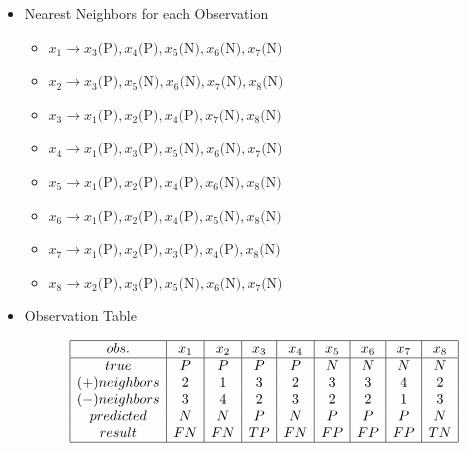 \documentclass[12pt]{article}
\begin{document}
\begin{enumerate}[leftmargin=\labelsep, label=\textbf{\arabic*.)}]
\begin{itemize}
              \item Nearest Neighbors for each Observation

                    \begin{itemize}
                        \item \( x_1 \rightarrow x_3\text{(P)}, x_4\text{(P)}, x_5\text{(N)}, x_6\text{(N)}, x_7\text{(N)} \)
                        \item \( x_2 \rightarrow x_3\text{(P)}, x_5\text{(N)}, x_6\text{(N)}, x_7\text{(N)}, x_8\text{(N)} \)
                        \item \( x_3 \rightarrow x_1\text{(P)}, x_2\text{(P)}, x_4\text{(P)}, x_7\text{(N)}, x_8\text{(N)} \)
                        \item \( x_4 \rightarrow x_1\text{(P)}, x_3\text{(P)}, x_5\text{(N)}, x_6\text{(N)}, x_7\text{(N)} \)
                        \item \( x_5 \rightarrow x_1\text{(P)}, x_2\text{(P)}, x_4\text{(P)}, x_6\text{(N)}, x_8\text{(N)} \)
                        \item \( x_6 \rightarrow x_1\text{(P)}, x_2\text{(P)}, x_4\text{(P)}, x_5\text{(N)}, x_8\text{(N)} \)
                        \item \( x_7 \rightarrow x_1\text{(P)}, x_2\text{(P)}, x_3\text{(P)}, x_4\text{(P)}, x_8\text{(N)} \)
                        \item \( x_8 \rightarrow x_2\text{(P)}, x_3\text{(P)}, x_5\text{(N)}, x_6\text{(N)}, x_7\text{(N)} \)
                    \end{itemize}

              \item Observation Table \\
                    \vspace{0.5em}
                    \begin{minipage}{1\textwidth}
                        \[
                            \begin{array}{|c|c|c|c|c|c|c|c|c|}
                                \hline
                                obs.          & x_1 & x_2 & x_3 & x_4 & x_5 & x_6 & x_7 & x_8 \\
                                \hline
                                true          & P   & P   & P   & P   & N   & N   & N   & N   \\
                                (+) neighbors & 2   & 1   & 3   & 2   & 3   & 3   & 4   & 2   \\
                                (-) neighbors & 3   & 4   & 2   & 3   & 2   & 2   & 1   & 3   \\
                                predicted     & N   & N   & P   & N   & P   & P   & P   & N   \\
                                result        & FN  & FN  & TP  & FN  & FP  & FP  & FP  & TN  \\
                                \hline
                            \end{array}
                        \]
                    \end{minipage}


\end{itemize}
\end{enumerate}
\end{document}
